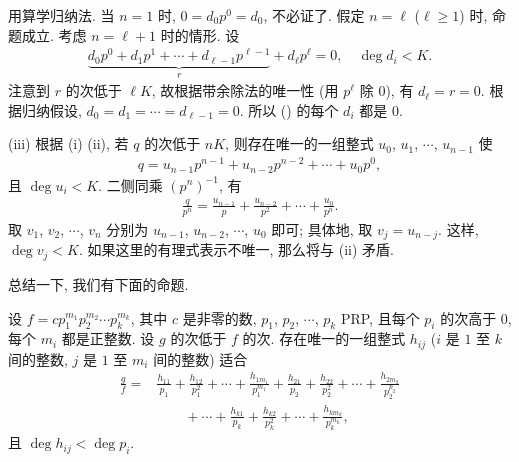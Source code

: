 \begin{pf}
    用算学归纳法. 当 $n = 1$ 时, $0 = d_0 p^0 = d_0$, 不必证了. 假定 $n = \ell$ ($\ell \geq 1$) 时, 命题成立. 考虑 $n = \ell + 1$ 时的情形. 设
    \begin{align*}
        {\underbrace{d_0 p^0 + d_1 p^1 + \cdots + d_{\ell - 1} p^{\ell - 1}}_{r}} + d_\ell p^\ell = 0, \quad \deg d_i < K.
    \end{align*}
    注意到 $r$ 的次低于 $\ell K$, 故根据带余除法的唯一性 (用 $p^\ell$ 除 $0$), 有 $d_\ell = r = 0$. 根据归纳假设, $d_0 = d_1 = \cdots = d_{\ell - 1} = 0$. 所以 (\myStar) 的每个 $d_i$ 都是 $0$.

    (iii) 根据 (i) (ii), 若 $q$ 的次低于 $nK$, 则存在唯一的一组整式 $u_0$, $u_1$, $\cdots$, $u_{n-1}$ 使
    \begin{align*}
        q = u_{n-1} p^{n-1} + u_{n-2} p^{n-2} + \cdots + u_0 p^0,
    \end{align*}
    且 $\deg u_i < K$. 二侧同乘 $(p^n)^{-1}$, 有
    \begin{align*}
        \frac{q}{p^n} = \frac{u_{n-1}}{p} + \frac{u_{n-2}}{p^2} + \cdots + \frac{u_0}{p^n}.
    \end{align*}
    取 $v_1$, $v_2$, $\cdots$, $v_n$ 分别为 $u_{n-1}$, $u_{n-2}$, $\cdots$, $u_0$ 即可; 具体地, 取 $v_j = u_{n-j}$. 这样, $\deg v_j < K$. 如果这里的有理式表示不唯一, 那么将与 (ii) 矛盾.
\end{pf}

总结一下, 我们有下面的命题.
\begin{proposition}
    设 $f = c p_1^{m_1} p_2^{m_2} \cdots p_k^{m_k}$, 其中 $c$ 是非零的数, $p_1$, $p_2$, $\cdots$, $p_k$ PRP, 且每个 $p_i$ 的次高于 $0$, 每个 $m_i$ 都是正整数. 设 $g$ 的次低于 $f$ 的次. 存在唯一的一组整式 $h_{ij}$ ($i$ 是 $1$ 至 $k$ 间的整数, $j$ 是 $1$ 至 $m_i$ 间的整数) 适合
    \begin{align*}
        \frac{g}{f}
        = {} & \frac{h_{11}}{p_1} + \frac{h_{12}}{p_1^2} + \cdots + \frac{h_{1 m_1}}{p_1^{m_1}} + \frac{h_{21}}{p_2} + \frac{h_{22}}{p_2^2} + \cdots + \frac{h_{2 m_2}}{p_2^{p_2}} \\
             & \qquad + \cdots + \frac{h_{k1}}{p_k} + \frac{h_{k2}}{p_k^2} + \cdots + \frac{h_{k m_k}}{p_k^{m_k}},
    \end{align*}
    且 $\deg h_{ij} < \deg p_i$.
\end{proposition}

